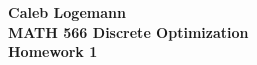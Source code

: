 \documentclass[11pt, oneside]{article}
\begin{document}
\noindent \textbf{\Large{Caleb Logemann \\
MATH 566 Discrete Optimization\\
Homework 1
}}

%
\begin{enumerate}


\end{enumerate}
\end{document}
